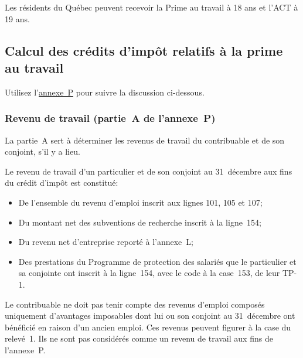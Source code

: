 \begin{note}
	Les résidents du Québec peuvent recevoir la Prime au travail à 18 ans et l'ACT à 19 ans.
\end{note}


\subsection{Calcul des crédits d'impôt relatifs à la prime au travail}
Utilisez l'\href{https://www.revenuquebec.ca/documents/fr/formulaires/tp/2023-12/TP-1.D.P%282023-12%29.pdf}{annexe~P} pour suivre la discussion ci-dessous.

\subsubsection{Revenu de travail (partie~A de l'annexe~P)}
La partie~A sert à déterminer les revenus de travail du contribuable et de son conjoint, s'il y a lieu.

Le revenu de travail d'un particulier et de son conjoint au 31~décembre aux fins du crédit d'impôt est constitué:
\begin{itemize}[label=]
	\item De l'ensemble du revenu d'emploi inscrit aux lignes 101, 105 et 107;
	\item Du montant net des subventions de recherche inscrit à la ligne~154;
	\item Du revenu net d'entreprise reporté à l'annexe~L;
	\item Des prestations du Programme de protection des salariés que le particulier et sa conjointe ont inscrit à la ligne~154, avec le code  \fg{} à la case~153, de leur TP-1.
\end{itemize}

Le contribuable ne doit pas tenir compte des revenus d'emploi composés uniquement d'avantages imposables dont lui ou son conjoint au 31~décembre ont bénéficié en raison d'un ancien emploi. Ces revenus peuvent figurer à la case  \fg{} du relevé~1. Ils ne sont pas considérés comme un revenu de travail aux fins de l'annexe~P.

